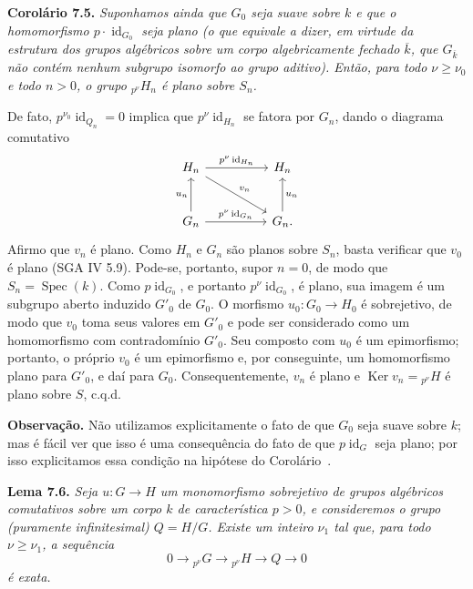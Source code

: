 
\medskip
\noindent{}\textbf{Corolário 7.5.}
\textit{Suponhamos ainda que \(G_0\) seja suave sobre \(k\) e que o
homomorfismo \(p\cdot\operatorname{id}_{G_0}\) seja plano (o que equivale
a dizer, em virtude da estrutura dos grupos algébricos sobre um corpo
algebricamente fechado \(\overline{k}\), que \(G_{\overline{k}}\) não
contém nenhum subgrupo isomorfo ao grupo aditivo). Então, para todo \(\nu\geq\nu_0\) e todo
\(n>0\), o grupo \({}_{p^\nu}H_n\) é plano sobre \(S_n\).}

De fato, \(p^{\nu_0}\operatorname{id}_{Q_n}=0\) implica que
\(p^\nu\operatorname{id}_{H_n}\) se fatora por \(G_n\), dando o
diagrama comutativo
\[
\begin{tikzcd}[column sep=huge,row sep=large]
H_n
  \arrow[r,"p^\nu\operatorname{id}_{H_n}"]
  \arrow[dr,"v_n"]
&
H_n
\\
G_n
  \arrow[u,"u_n"]
  \arrow[r,"p^\nu\operatorname{id}_{G_n}"]
&
G_n
  \arrow[u,"u_n"']
.
\end{tikzcd}
\]
Afirmo que \(v_n\) é plano. Como \(H_n\) e \(G_n\) são planos sobre
\(S_n\), basta verificar que \(v_0\) é plano (SGA IV 5.9). Pode-se,
portanto, supor \(n=0\), de modo que \(S_n=\operatorname{Spec}(k)\). Como
\(p\operatorname{id}_{G_0}\), e portanto
\(p^\nu\operatorname{id}_{G_0}\), é plano, sua imagem é um subgrupo aberto
induzido \(G'_0\) de \(G_0\). O morfismo \(u_0:G_0\to H_0\) é
sobrejetivo, de modo que \(v_0\) toma seus valores em \(G'_0\) e pode
ser considerado como um homomorfismo com contradomínio \(G'_0\). Seu composto com
\(u_0\) é um epimorfismo; portanto, o próprio \(v_0\) é um epimorfismo e,
por conseguinte, um homomorfismo plano para \(G'_0\), e daí para \(G_0\).
Consequentemente, \(v_n\) é plano e
\(\operatorname{Ker}v_n={}_{p^\nu}H\) é plano sobre \(S\), c.q.d.

\medskip
\noindent{}\textbf{Observação.}
Não utilizamos explicitamente o fato de que \(G_0\) seja suave
sobre \(k\); mas é fácil ver que isso é uma consequência do fato de
que \(p\operatorname{id}_{G}\) seja plano; por isso explicitamos essa
condição na hipótese do Corolário~.

\medskip
\noindent{}\textbf{Lema 7.6.}
\textit{Seja \(u:G\to H\) um monomorfismo sobrejetivo de grupos
algébricos comutativos sobre um corpo \(k\) de característica \(p>0\),
e consideremos o grupo (puramente infinitesimal) \(Q=H/G\). Existe um inteiro
\(\nu_1\) tal que, para todo \(\nu\geq\nu_1\), a sequência}
\[
  0\longrightarrow{}_{p^\nu}G
  \longrightarrow{}_{p^\nu}H
  \longrightarrow Q\longrightarrow0
\]
\textit{é exata.}


